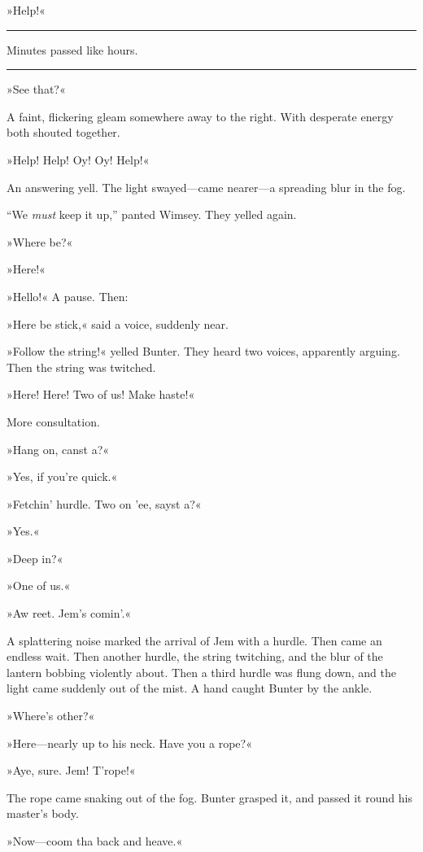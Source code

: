 »Help!« 

\noindent\hfil\rule{0.5\textwidth}{.4pt}\hfil 

Minutes passed like hours. 

\noindent\hfil\rule{0.5\textwidth}{.4pt}\hfil 

»See that?«

A faint, flickering gleam somewhere away to the right. With desperate energy both shouted together.

»Help! Help! Oy! Oy! Help!«

An answering yell. The light swayed\allowbreak---\allowbreak came nearer\allowbreak---\allowbreak a spreading blur in the fog.

\enquote{We \textit{must} keep it up,} panted Wimsey. They yelled again.

»Where be?«

»Here!«

»Hello!« A pause. Then:

»Here be stick,« said a voice, suddenly near.

»Follow the string!« yelled Bunter. They heard two voices, apparently arguing. Then the string was twitched.

»Here! Here! Two of us! Make haste!«

More consultation.

»Hang on, canst a?«

»Yes, if you're quick.«

»Fetchin' hurdle. Two on 'ee, sayst a?«

»Yes.«

»Deep in?«

»One of us.«

»Aw reet. Jem's comin'.«

A splattering noise marked the arrival of Jem with a hurdle. Then came an endless wait. Then another hurdle, the string twitching, and the blur of the lantern bobbing violently about. Then a third hurdle was flung down, and the light came suddenly out of the mist. A hand caught Bunter by the ankle.

»Where's other?«

»Here\allowbreak---\allowbreak nearly up to his neck. Have you a rope?«

»Aye, sure. Jem! T'rope!«

The rope came snaking out of the fog. Bunter grasped it, and passed it round his master's body.

»Now\allowbreak---\allowbreak coom tha back and heave.«

